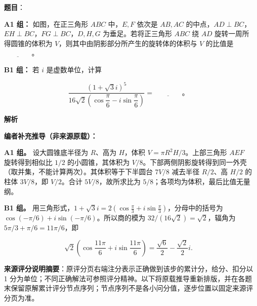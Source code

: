 \begin{answer}

\textbf{题目}：

\textbf{A1 组：} 如图，在正三角形 $ABC$ 中，$E,F$ 依次是 $AB,AC$ 的中点，$AD\perp BC$，$EH\perp BC$，$FG\perp BC$，$D,H,G$ 为垂足。若将正三角形 $ABC$ 绕 $AD$ 旋转一周所得圆锥的体积为 $V$，则其中由阴影部分所产生的旋转体的体积与 $V$ 的比值是 $\underline{\qquad\qquad}$。
\nopagebreak[4]
\begin{center}\end{center}
\nopagebreak[4]
\textbf{B1 组：} 若 $i$ 是虚数单位，计算

\nopagebreak[4]
\[
\dfrac{(1+\sqrt3i)^5}{16\sqrt2\left(\cos\dfrac{\pi}{6}-i\sin\dfrac{\pi}{6}\right)}=\underline{\qquad\qquad}\text{。}
\]

\textbf{解析}

\textbf{编者补充推导（非来源原载）：}

\textbf{A1 组。} 设大圆锥底半径为 $R$、高为 $H$，体积 $V=\pi R^2H/3$。上部三角形 $AEF$ 旋转得到相似比 $1/2$ 的小圆锥，其体积为 $V/8$。下部两侧阴影旋转得到同一外壳（取并集，不能计算两次）。其体积等于下半圆台 $7V/8$ 减去半径 $R/2$、高 $H/2$ 的柱体 $3V/8$，即 $V/2$。合计 $5V/8$，故所求比为 $5/8$；各项均为体积，最后比值无量纲。

\textbf{B1 组。} 用三角形式，$1+\sqrt3i=2(\cos\frac\pi3+i\sin\frac\pi3)$，分母中的括号为 $\cos(-\pi/6)+i\sin(-\pi/6)$。所以商的模为 $32/(16\sqrt2)=\sqrt2$，辐角为 $5\pi/3+\pi/6=11\pi/6$，即

\nopagebreak[4]
\[\sqrt2\left(\cos\frac{11\pi}{6}+i\sin\frac{11\pi}{6}\right)
=\frac{\sqrt6}{2}-\frac{\sqrt2}{2}i.\]


\end{answer}

\begin{gktip}
\textbf{来源评分说明摘要}：原评分页右端注分表示正确做到该步的累计分，给分、扣分以 1 分为单位；不同正确解法可参照评分精神。以下将原载推导重新排版，并在各题末保留原解累计评分节点序列；节点序列不是各小问分值，逐步位置以固定来源评分页为准。
\end{gktip}

